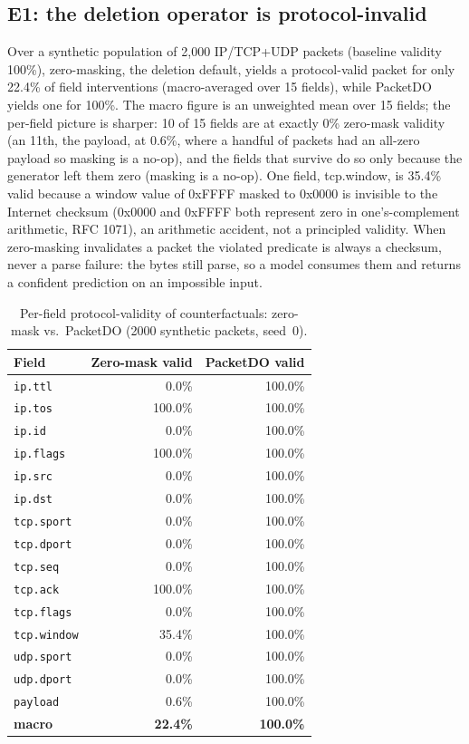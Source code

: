\documentclass[journal]{IEEEtran}
\begin{document}
\subsection{E1: the deletion operator is protocol-invalid}

Over a synthetic population of 2,000 IP/TCP+UDP packets (baseline
validity 100\%), zero-masking, the deletion default, yields a
protocol-valid packet for only 22.4\% of field interventions
(macro-averaged over 15 fields), while PacketDO yields one for 100\%.
The macro figure is an unweighted mean over 15 fields; the per-field
picture is sharper: 10 of 15 fields are at exactly 0\% zero-mask
validity (an 11th, the payload, at 0.6\%, where a handful of packets had
an all-zero payload so masking is a no-op), and the fields that survive
do so only because the generator left them zero (masking is a no-op).
One field, tcp.window, is 35.4\% valid because a window value of 0xFFFF
masked to 0x0000 is invisible to the Internet checksum (0x0000 and
0xFFFF both represent zero in one's-complement arithmetic, RFC 1071), an
arithmetic accident, not a principled validity. When zero-masking
invalidates a packet the violated predicate is always a checksum, never
a parse failure: the bytes still parse, so a model consumes them and
returns a confident prediction on an impossible input.

\begin{table}[!t]
\centering
\caption{Per-field protocol-validity of counterfactuals: zero-mask vs.\ PacketDO (2000 synthetic packets, seed~0).}
\label{tab:e1}
\small
\begin{tabular}{@{}lrr@{}}
\toprule
Field & Zero-mask valid & PacketDO valid \\
\midrule
\texttt{ip.ttl} & 0.0\% & 100.0\% \\
\texttt{ip.tos} & 100.0\% & 100.0\% \\
\texttt{ip.id} & 0.0\% & 100.0\% \\
\texttt{ip.flags} & 100.0\% & 100.0\% \\
\texttt{ip.src} & 0.0\% & 100.0\% \\
\texttt{ip.dst} & 0.0\% & 100.0\% \\
\texttt{tcp.sport} & 0.0\% & 100.0\% \\
\texttt{tcp.dport} & 0.0\% & 100.0\% \\
\texttt{tcp.seq} & 0.0\% & 100.0\% \\
\texttt{tcp.ack} & 100.0\% & 100.0\% \\
\texttt{tcp.flags} & 0.0\% & 100.0\% \\
\texttt{tcp.window} & 35.4\% & 100.0\% \\
\texttt{udp.sport} & 0.0\% & 100.0\% \\
\texttt{udp.dport} & 0.0\% & 100.0\% \\
\texttt{payload} & 0.6\% & 100.0\% \\
\midrule
\textbf{macro} & \textbf{22.4\%} & \textbf{100.0\%} \\
\bottomrule
\end{tabular}
\end{table}
\end{document}
